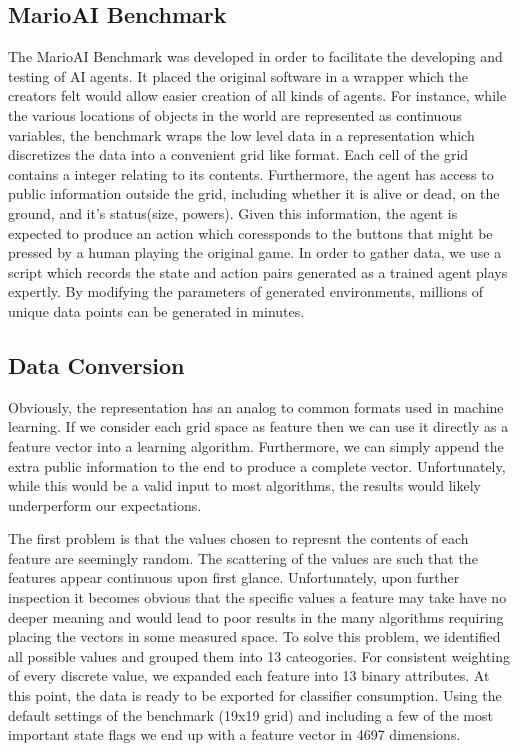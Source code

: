 \documentclass[]{article}   %
\begin{document}
\subsection{MarioAI Benchmark}
The MarioAI Benchmark \cite{mariobenchmark} was developed in order to facilitate the developing and testing of AI agents.  It placed the original software in a wrapper which the creators felt would allow easier creation of all kinds of agents.  For instance, while the various locations of objects in the world are represented as continuous variables, the benchmark wraps the low level data in a representation which discretizes the data into a convenient grid like format.  Each cell of the grid contains a integer relating to its contents.  Furthermore, the agent has access to public information outside the grid, including whether it is alive or dead, on the ground, and it's status(size, powers).  Given this information, the agent is expected to produce an action which coressponds to the buttons that might be pressed by a human playing the original game.  In order to gather data, we use a script which records the state and action pairs generated as a trained agent \cite{speed} plays expertly.  By modifying the parameters of generated environments, millions of unique data points can be generated in minutes.
\subsection{Data Conversion}
Obviously, the representation has an analog to common formats used in machine learning.  If we consider each grid space as feature then we can use it directly as a feature vector into a learning algorithm.  Furthermore, we can simply append the extra public information to the end to produce a complete vector.  Unfortunately, while this would be a valid input to most algorithms, the results would likely underperform our expectations.
\newline\newline

The first problem is that the values chosen to represnt the contents of each feature are seemingly random.  The scattering of the values are such that the features appear continuous upon first glance.  Unfortunately, upon further inspection it becomes obvious that the specific values a feature may take have no deeper meaning and would lead to poor results in the many algorithms requiring placing the vectors in some measured space.  To solve this problem, we identified all possible values and grouped them into 13 cateogories.  For consistent weighting of every discrete value, we expanded each feature into 13 binary attributes.  At this point, the data is ready to be exported for classifier consumption.  Using the default settings of the benchmark (19x19 grid) and including a few of the most important state flags we end up with a feature vector in 4697 dimensions.
\end{document}
